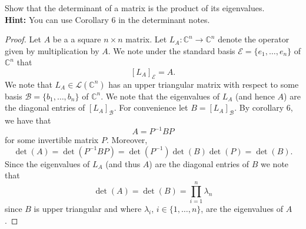\documentclass[11pt]{exam}
\theoremstyle{definition}
\begin{document}
\begin{questions}
\question Show that the determinant of a matrix is the product of its eigenvalues.\vspace{-.1in}\\

{\bf Hint: }You can use Corollary 6 in the determinant notes. 
\begin{proof} Let $A$ be a a square $n\times n$ matrix. Let $L_A:\mathbb{C}^n\rightarrow \mathbb{C}^n$ denote the operator given by multiplication by $A$. We note under the standard basis $\mathcal{E}=\{e_1,\ldots, e_n\}$ of $\mathbb{C}^n$ that 
\[[L_A]_{\mathcal{E}}=A.\]
We note that $L_A\in \mathcal{L}(\mathbb{C}^n)$ has an upper triangular matrix with respect to some basis $\mathcal{B}=\{b_1,\ldots, b_n\}$ of $\mathbb{C}^n$. We note that the eigenvalues of $L_A$ (and hence $A$) are the diagonal entries of $[L_A]_\mathcal{B}$. For convenience let $B=[L_A]_\mathcal{B}$.  By corollary 6, we have that 
\[A=P^{-1}BP\] for some invertible matrix $P$. Moreover, 
\[\det(A)=\det(P^{-1}BP)=\det(P^{-1})\det(B)\det(P)=\det(B).\]
Since the eigenvalues of $L_A$ (and thus $A$) are the diagonal entries of $B$ we note that 
\[\det(A)=\det(B)=\prod_{i=1}^n\lambda_n\]
since $B$ is upper triangular and where $\lambda_i$, $i\in \{1,\ldots, n\}$, are the eigenvalues of $A$. 
\end{proof}


\end{questions}
\end{document}
